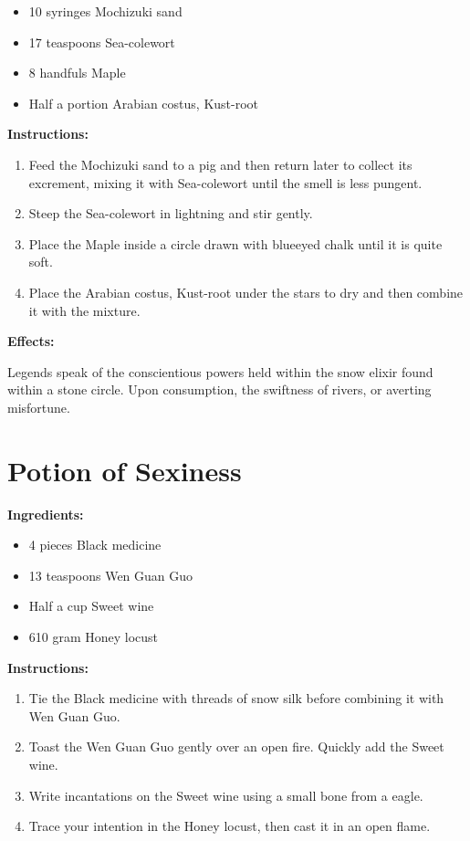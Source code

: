 \documentclass{article}
\begin{document}
\begin{itemize}
  \item 10 syringes Mochizuki sand
  \item 17 teaspoons Sea-colewort
  \item 8 handfuls Maple
  \item Half a portion Arabian costus, Kust-root
\end{itemize}

\textbf{Instructions:}

\begin{enumerate}
  \item Feed the Mochizuki sand to a pig and then return later to collect its excrement, mixing it with Sea-colewort until the smell is less pungent.
  \item Steep the Sea-colewort in lightning and stir gently.
  \item Place the Maple inside a circle drawn with blueeyed chalk until it is quite soft.
  \item Place the Arabian costus, Kust-root under the stars to dry and then combine it with the mixture.
\end{enumerate}

\textbf{Effects:}

Legends speak of the conscientious powers held within the snow elixir found within a stone circle. Upon consumption, the swiftness of rivers, or averting misfortune.

\newpage
\section*{Potion of Sexiness}

\textbf{Ingredients:}

\begin{itemize}
  \item 4 pieces Black medicine
  \item 13 teaspoons Wen Guan Guo
  \item Half a cup Sweet wine
  \item 610 gram Honey locust
\end{itemize}

\textbf{Instructions:}

\begin{enumerate}
  \item Tie the Black medicine with threads of snow silk before combining it with Wen Guan Guo.
  \item Toast the Wen Guan Guo gently over an open fire. Quickly add the Sweet wine.
  \item Write incantations on the Sweet wine using a small bone from a eagle.
  \item Trace your intention in the Honey locust, then cast it in an open flame.
\end{enumerate}
\end{document}
